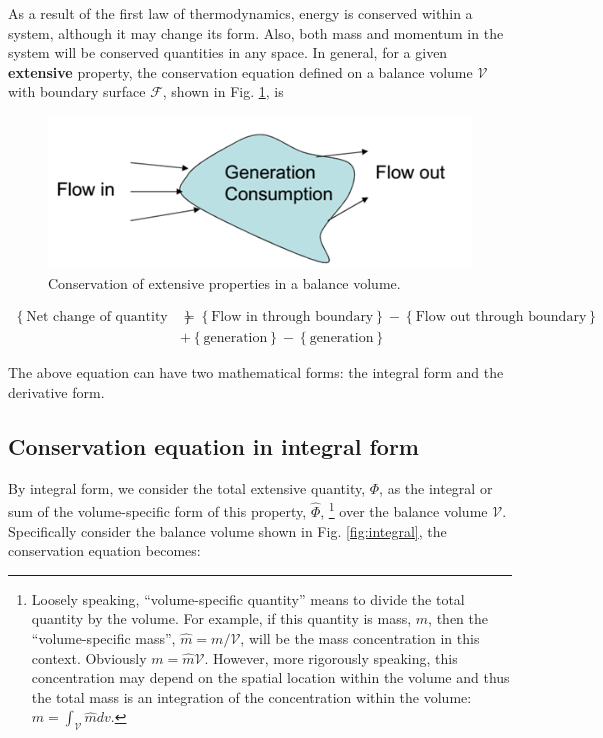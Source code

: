 \documentclass[a4paper,11pt]{article}
\theoremstyle{definition}
\begin{document}
As a result of the first law of thermodynamics, energy is conserved within a system,
although it may change its form. Also, both mass and momentum in the system will
be conserved quantities in any space. In general, for a given \textbf{extensive} property,
the conservation equation defined on a balance volume $\mathcal{V}$ with boundary surface $\mathcal{F}$,
shown in Fig. \ref{fig:conserv}, is

\begin{figure} [!h]
 \begin{center}
	\includegraphics[width=.5\textwidth]{conserv}
 \end{center}
 \caption{Conservation of extensive properties in a balance volume.} 
 \label{fig:conserv}
\end{figure} 

\begin{align}
	\left\{ \textrm{Net change of quantity in time} \right\} &= \left\{ \textrm{Flow in through boundary} \right\} 
		- \left\{ \textrm{Flow out through boundary} \right\} \nonumber \\
		&+ \left\{ \textrm{generation} \right\}	- \left\{ \textrm{generation} \right\}	
\end{align}

The above equation can have two mathematical forms: the integral form and the derivative form. 

\subsection*{Conservation equation in integral form}

By integral form, 
we consider the total extensive quantity, $\Phi$, as the integral or sum of the volume-specific form of this property, 
$\hat{\Phi}$, 
\footnote{Loosely speaking, ``volume-specific quantity'' means to divide the total quantity by the volume. For example, if this quantity is 
mass, $m$, then the ``volume-specific mass'', $\hat{m}=m/\mathcal{V}$, will be the mass concentration in this context. Obviously
$m = \hat{m} \mathcal{V}$.
However, more rigorously speaking, this concentration may depend on the spatial location within the volume and thus the total mass
is an integration of the concentration within the volume: $m = \int_{\mathcal{V}} \hat{m} dv$.}
over the balance volume $\mathcal{V}$. Specifically consider the balance volume shown in Fig. \ref{fig:integral}, the conservation equation becomes:
\end{document}
